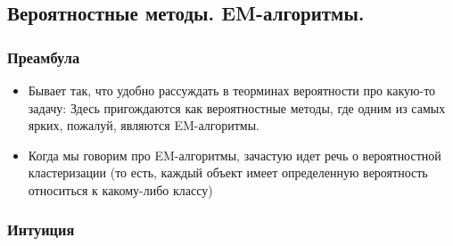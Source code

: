     \subsection{Вероятностные методы. EM-алгоритмы.}

        \subsubsection{Преамбула}

            \begin{itemize}
                \item Бывает так, что удобно рассуждать в теорминах вероятности про какую-то задачу: Здесь пригождаются как вероятностные методы, где одним из самых ярких, пожалуй, являются EM-алгоритмы.

                \item Когда мы говорим про EM-алгоритмы, зачастую идет речь о вероятностной кластеризации (то есть, каждый объект имеет определенную вероятность относиться к какому-либо классу)
            \end{itemize}

        \subsubsection{Интуиция}

